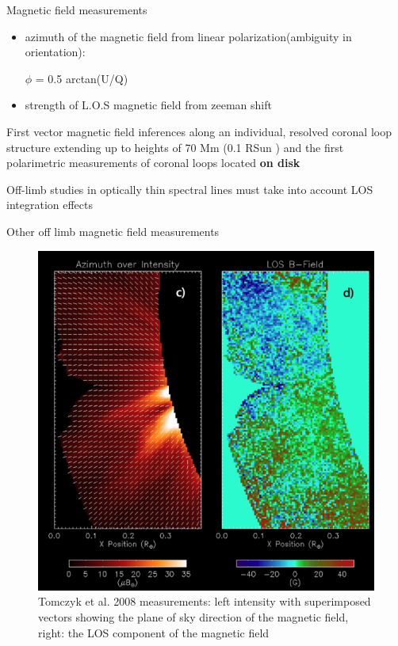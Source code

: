 \documentclass{beamer}
\begin{document}
\begin{frame}{Magnetic field measurements}

\begin{itemize}
\item azimuth of the magnetic field from linear polarization(ambiguity in orientation): 

$\phi$ = 0.5 arctan(U/Q)

\item strength of L.O.S  magnetic field from zeeman shift
\end{itemize}
First vector
magnetic field inferences along an individual, resolved coronal
loop structure extending up to heights of 70 Mm (0.1 RSun ) and
the first polarimetric measurements of coronal loops located {\bf on
disk}

Off-limb studies in
optically thin spectral lines must take into account LOS
integration effects

\end{frame}

\begin{frame}{Other off limb magnetic field measurements}
 
\begin{figure}[H]
 \centering
 \includegraphics[scale=0.27]{t1c.png}
\caption{Tomczyk et al. 2008 measurements: left intensity with superimposed vectors showing the plane of sky direction
of the magnetic field, right: the LOS component of the magnetic field}
\end{figure}
\end{frame}
\end{document}

